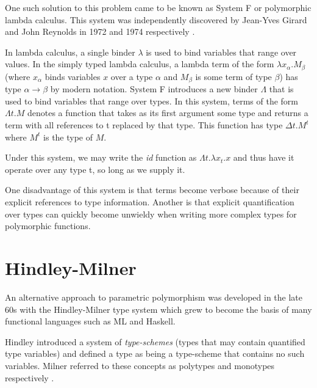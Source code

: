           One such solution to this problem came to be known as System F
          or polymorphic lambda calculus. This system was independently
          discovered by Jean-Yves Girard and John Reynolds in 1972 and 1974
          respectively \cite{Girard1972,reynolds1974}.
      
          In lambda calculus, a single binder $\lambda$ is used to bind variables
          that range over values. In the simply typed lambda calculus, a
          lambda term of the form $\lambda x_{\alpha}.M_{\beta}$ (where
          $x_{\alpha}$ binds variables $x$ over a type $\alpha$ and
          $M_{\beta}$ is some term of type $\beta $) has type
          $\alpha\to\beta$ by modern notation. System F introduces a new
          binder $\Lambda$ that is used to bind variables that range over
          types. In this system, terms of the form $\Lambda t.M$ denotes a
          function that takes as its first argument some type and returns a
          term with all references to t replaced by that type. This function
          has type $\Delta t.M^{t}$ where $M^t$ is the type of $M$.
      
          Under this system, we may write the \emph{id} function as $\Lambda t
          . \lambda x_t . x$ and thus have it operate over any type t,
          so long as we supply it.
      
          One disadvantage of this system is that terms become verbose
          because of their explicit references to type
          information. Another is that explicit quantification over
          types can quickly become unwieldy when writing more complex
          types for polymorphic functions.

          \section{Hindley-Milner}
            An alternative approach to parametric polymorphism was
            developed in the late 60s with the Hindley-Milner type
            system which grew to become the basis of many functional
            languages such as ML and Haskell.
                        
            Hindley introduced a system of \textit{type-schemes}
            \cite{hindley1969} (types that may contain quantified type
            variables) and defined a type as being a type-scheme that
            contains no such variables. Milner referred to these
            concepts as polytypes and monotypes respectively
            \cite{milner1978}. 
            
